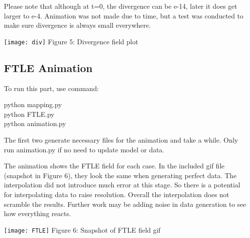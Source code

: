 \documentclass[12pt]{article}
\begin{document}
Please note that although at t=0, the divergence can  be e-14, later it does get larger to e-4. Animation was not made due to time, but a test was conducted to make sure divergence is always small everywhere. 

\begin{center}
\texttt{[image: div]}
\small Figure 5: Divergence field plot
\end{center}

\subsection{FTLE Animation}
To run this part, use command:

\begin{center}
python mapping.py\\
python FTLE.py \\
python animation.py\\
\end{center} 
The first two generate necessary files for the animation and take a while. Only run animation.py if no need to update model or data.

The animation shows the FTLE field for each case. In the included gif file (snapshot in Figure 6), they look the same when generating perfect data. The interpolation did not introduce much error at this stage. So there is a potential for interpolating data to raise resolution. Overall the interpolation does not scramble the results. Further work may be adding noise in data generation to see how everything reacts.

\begin{center}
\texttt{[image: FTLE]}
\small Figure 6: Snapshot of FTLE field gif
\end{center}

   
\end{document}
